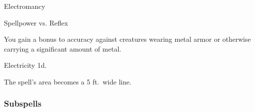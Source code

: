 \newpage
\begin{spellsection}{Electromancy}

\begin{spellheader}
\end{spellheader}

\begin{spellcontent}

\begin{spelltargetinginfo}




\end{spelltargetinginfo}


\begin{spelleffects}




\begin{spellattack}{Spellpower vs. Reflex}


\spellspecial You gain a  bonus to accuracy against creatures wearing metal armor or otherwise carrying a significant amount of metal.


\hit
Electricity  \minus1d.



\end{spellattack}





\end{spelleffects}

\end{spellcontent}
\begin{spellfooter}


\end{spellfooter}
\begin{spellsubcontent}


\begin{spellcantrip}
The spell's area becomes a 5 ft.\ wide \areamed line.
\end{spellcantrip}


\end{spellsubcontent}
\end{spellsection}


\subsubsection{Subspells}


